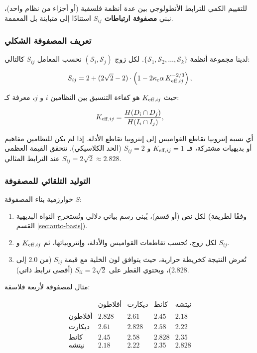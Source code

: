 \documentclass[11pt,a4paper]{article}
\newcommand{\kappac}{\kappa_c}
\begin{document}
	للتقييم الكمي للترابط الأنطولوجي بين عدة أنظمة فلسفية (أو أجزاء من نظام واحد)، نبني \textbf{مصفوفة ارتباطات \(S_{ij}\)} استنادًا إلى متباينة بل المعممة.
	
	\subsubsection{تعريف المصفوفة الشكلي}
	
	لدينا مجموعة أنظمة \(\{\mathcal{S}_1, \mathcal{S}_2, \dots, \mathcal{S}_k\}\). لكل زوج \((\mathcal{S}_i, \mathcal{S}_j)\) نحسب المعامل \(S_{ij}\) كالتالي:
	
	\[
	S_{ij} = 2 + (2\sqrt{2} - 2) \cdot \left(1 - 2\kappac \alpha \, \Keff[ij]^{-2/3}\right),
	\]
	
	حيث \(\Keff[ij]\) هو كفاءة التنسيق بين النظامين \(i\) و \(j\)، معرفة كـ:
	
	\[
	\Keff[ij] = \frac{H(D_i \cap D_j)}{H(I_i \cap I_j)},
	\]
	
	أي نسبة إنتروبيا تقاطع القواميس إلى إنتروبيا تقاطع الأدلة. إذا لم يكن للنظامين مفاهيم أو بديهيات مشتركة، فـ \(\Keff[ij] = 1\) و \(S_{ij} = 2\) (الحد الكلاسيكي). تتحقق القيمة العظمى \(S_{ij} = 2\sqrt{2} \approx 2.828\) عند الترابط المثالي.
	
	\subsubsection{التوليد التلقائي للمصفوفة}
	
	خوارزمية بناء المصفوفة \(S\):
	
	\begin{enumerate}
		\item لكل نص (أو قسم)، يُبنى رسم بياني دلالي وتُستخرج النواة البديهية (وفقًا لطريقة القسم \ref{sec:auto-basis}).
		\item لكل زوج، تُحسب تقاطعات القواميس والأدلة، وإنتروبياتها، ثم \(\Keff[ij]\) و \(S_{ij}\).
		\item تُعرض النتيجة كخريطة حرارية، حيث يتوافق لون الخلية مع قيمة \(S_{ij}\) (من 2.0 إلى 2.828)، ويحتوي القطر على \(S_{ii} = 2\sqrt{2}\) (أقصى ترابط ذاتي).
	\end{enumerate}
	
	مثال لمصفوفة لأربعة فلاسفة:
	
	\[
	\begin{array}{c|cccc}
		& \text{أفلاطون} & \text{ديكارت} & \text{كانط} & \text{نيتشه} \\
		\hline
		\text{أفلاطون} & 2.828 & 2.61 & 2.45 & 2.18 \\
		\text{ديكارت} & 2.61 & 2.828 & 2.58 & 2.22 \\
		\text{كانط}   & 2.45 & 2.58 & 2.828 & 2.35 \\
		\text{نيتشه}  & 2.18 & 2.22 & 2.35 & 2.828 \\
	\end{array}
	\]
	
\end{document}
